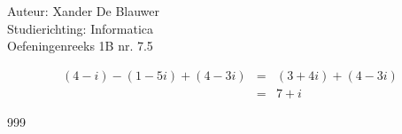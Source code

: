 \documentclass[a4paper]{article}
\begin{document}
\noindent \large Auteur: Xander De Blauwer \\
\noindent \large Studierichting: Informatica\\
\noindent \large Oefeningenreeks 1B nr. 7.5\\

\medskip

\normalsize

\begin{eqnarray*}
  (4 - i) - (1 - 5i) + (4 - 3i)
  &=& (3 + 4i) + (4 - 3i) \\
  &=& 7 + i
\end{eqnarray*}



\begin{thebibliography}{999}
\end{thebibliography}
\end{document}
